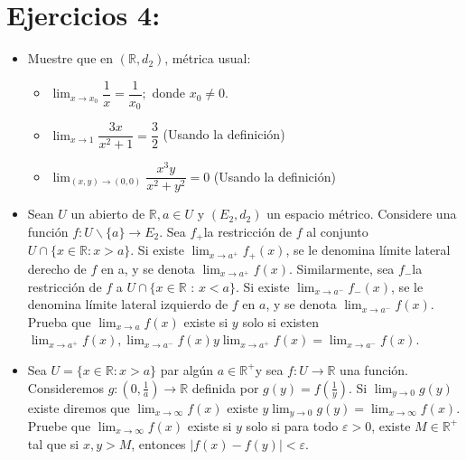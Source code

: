 \section{Ejercicios 4:}

\begin{itemize}

    \item  Muestre que en $\left(\mathbb{R}, d_2\right)$, métrica usual:

    \begin{itemize}
        
        \item $\lim _{x \rightarrow x_0} \dfrac{1}{x}=\dfrac{1}{x_0} ;$ donde $x_0 \neq 0$.
        
        \item  $\lim _{x \rightarrow 1} \dfrac{3 x}{x^2+1}=\dfrac{3}{2}$ (Usando la definición)
        
        \item $\lim _{(x, y) \rightarrow(0,0)} \dfrac{x^3 y}{x^2+y^2}=0$ (Usando la definición)
        
    \end{itemize}

    \item Sean $U$ un abierto de $\mathbb{R}, a \in U$ y $\left(E_2, d_2\right)$ un espacio métrico. Considere una función $f: U \backslash\{a\} \rightarrow E_2$. Sea $f_{+}$la restricción de $f$ al conjunto $U \cap\{x \in \mathbb{R}: x>a\}$. Si existe $\lim _{x \rightarrow a^{+}} f_{+}(x)$, se le denomina límite lateral derecho de $f$ en a, y se denota $\lim _{x \rightarrow a^{+}} f(x)$. Similarmente, sea $f_{-}$la restricción de $f$ a $U \cap\{x \in \mathbb{R}$ : $x<a\}$. Si existe $\operatorname{lim}_{x \rightarrow a^{-}} f_{-}(x)$, se le denomina límite lateral izquierdo de $f$ en $a$, y se denota $\lim _{x \rightarrow a^{-}} f(x)$. Prueba que $\lim _{x \rightarrow a} f(x)$ existe si $y$ solo si existen $\lim _{x \rightarrow a^{+}} f(x), \lim _{x \rightarrow a^{-}} f(x) y \lim _{x \rightarrow a^{+}} f(x)=\lim _{x \rightarrow a^{-}} f(x)$.\\
    
    \item Sea $U=\{x \in \mathbb{R}: x>a\}$ par algún $a \in \mathbb{R}^{+}$y sea $f: U \rightarrow \mathbb{R}$ una función. Consideremos $g:\left(0, \frac{1}{a}\right) \rightarrow \mathbb{R}$ definida por $g(y)=f\left(\frac{1}{y}\right)$. Si $\lim _{y \rightarrow 0} g(y)$ existe diremos que $\lim _{x \rightarrow \infty} f(x)$ existe $y \lim _{y \rightarrow 0} g(y)=\lim _{x \rightarrow \infty} f(x)$. Pruebe que $\lim _{x \rightarrow \infty} f(x)$ existe si $y$ solo si para todo $\varepsilon>0$, existe $M \in \mathbb{R}^{+}$tal que si $x, y>M$, entonces $|f(x)-f(y)|<\varepsilon$.\\


\end{itemize}
